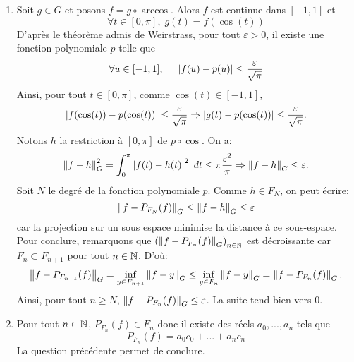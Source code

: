 \begin{enumerate}
\item Soit $g\in G$ et posons $f=g\circ \arccos$. Alors $f$ est continue dans $[-1,1]$ et
\begin{displaymath}
\forall t \in [0,\pi],\; g(t) = f(\cos(t))  
\end{displaymath}
D'après le théorème admis de Weirstrass, pour tout $\varepsilon >0$, il existe une fonction polynomiale $p$ telle que
\begin{displaymath}
 \forall u\in [-1,1],\hspace{0.5cm} \left\vert f(u)-p(u)\right\vert\leq \frac{\varepsilon}{\sqrt{\pi}} 
\end{displaymath}
Ainsi, pour tout $t\in [0,\pi]$, comme $\cos(t)\in [-1,1]$,
\begin{displaymath}
\left\vert f(\cos(t))-p(\cos(t))\right\vert\leq \frac{\varepsilon}{\sqrt{\pi}} \Rightarrow \left\vert g(t)-p(\cos(t))\right\vert\leq \frac{\varepsilon}{\sqrt{\pi}}.
\end{displaymath}
Notons $h$ la restriction à $[0,\pi]$ de $p\circ\cos$. On a:
\begin{displaymath}
\left\Vert f-h\right\Vert_{G}^{2} = \int_{0}^{\pi}\left\vert f(t)-h(t)\right\vert^{2}\ dt \leq \pi \frac{\varepsilon^{2}}{\pi}  
\Rightarrow \left\Vert f-h\right\Vert_{G}\leq \varepsilon.
\end{displaymath}
Soit $N$ le degré de la fonction polynomiale $p$. Comme $h\in F_{N}$, on peut écrire:
$$\left\Vert f-P_{F_{N}}(f)\right\Vert_{G} \leq \left\Vert f-h\right\Vert_{G} \leq \varepsilon$$
car la projection sur un sous espace minimise la distance à ce sous-espace. Pour conclure, remarquons que $\left( \left\Vert f-P_{F_{n}}(f)\right\Vert_{G}\right)_{n\in \mathbb{N}} $ est décroissante car $F_{n}\subset F_{n+1}$ pour tout $n\in \mathbb{N}$. D'où:
$$\left\Vert f-P_{F_{n+1}}(f)\right\Vert_{G} = \inf_{y\in F_{n+1}}\left\Vert f-y\right\Vert_{G}\leq \inf_{y\in F_{n}}\left\Vert f-y\right\Vert_{G} = \left\Vert f-P_{F_{n}}(f)\right\Vert_{G}.$$
Ainsi, pour tout $n\geq N$, $\left\Vert f-P_{F_{n}}(f)\right\Vert_{G} \leq \varepsilon$. La suite tend bien vers $0$.

\item Pour tout $n\in \mathbb{N}$, $P_{F_{n}}(f)\in F_{n}$ donc il existe des réels $a_{0},...,a_{n}$ tels que
\begin{displaymath}
P_{F_{n}}(f) = a_{0}c_{0}+...+a_{n}c_{n}  
\end{displaymath}
La question précédente permet de conclure.
\end{enumerate}
